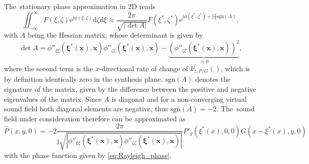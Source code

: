 \documentclass[12pt,a4paper]{article}
\newcommand{\td}{\mathrm{d}}
\newcommand{\te}{\mathrm{e}}
\newcommand{\ti}{\mathrm{j}}
\newcommand{\vx}{\mathbf{x}}
\newcommand{\vxi}{\bm{\xi}}
\begin{document}
The~stationary phase approximation in 2D reads
\begin{equation}
\iint_{-\infty}^{\infty} F(\xi,\zeta) \te^{\ti \phi(\xi,\zeta)}\td \zeta \td \xi \approx
\frac{2\pi}{\sqrt{|\det A|}}F(\xi^*,\zeta^*) \te^{\ti \phi (\xi^*,\zeta^*) + \ti \frac{\pi}{4} \text{sgn} (A)},
\end{equation}
with $A$ being the Hessian matrix, whose determinant is given by
\begin{equation}
\det A = \phi''_{\xi\xi}(\vxi^*(\vx),\vx) \phi''_{\zeta\zeta}(\vxi^*(\vx),\vx) - \underbrace{\left( \phi''_{\zeta\xi}(\vxi^*(\vx),\vx) \right)^2}_{ \equiv 0},
\end{equation}
where the second term is the $x$-directional rate of change of $k^l_{z,P/G}()$, which is by definition identically zero in the synthesis plane. $\text{sgn}(A)$ denotes the signature of the matrix, given by the difference between the positive and negative eigenvalues of the matrix. Since $A$ is diagonal and for a non-converging virtual sound field both diagonal elements are negative, thus $\text{sgn} (A) = -2$.
The~sound field under consideration therefore can be approximated as
\begin{equation}
\hat{P}(x,y,0) =  -2 \frac{2\pi}{\ti \sqrt{|\phi''_{\xi\xi}(\vxi^*(\vx),\vx) \phi''_{\zeta\zeta}(\vxi^*(\vx),\vx)|}} P'_y(\xi^*(x),0,0) G(x-\xi^*(x),y,0)
\label{eq:Rayleigh_SPA}
\end{equation}
with the phase function given by \eqref{eq:Rayleigh_phase}.
\end{document}

